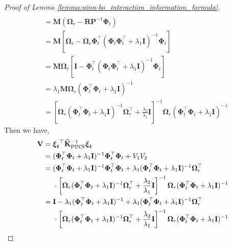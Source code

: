 \begin{proof}[Proof of Lemma \ref{lemma:pinn-bo_interaction_information_formula}]
\begin{align*}
\\
            & = \mathbf{M}(\boldsymbol{\Omega}_r - \mathbf{R}\mathbf{P}^{-1}\boldsymbol{\Phi}_t)
\\
            & = \mathbf{M}\left[\boldsymbol{\Omega}_r - \boldsymbol{\Omega}_r \boldsymbol{\Phi}_t^\top (\boldsymbol{\Phi}_t \boldsymbol{\Phi}_t^\top + \lambda_1\mathbf{I})^{-1}\boldsymbol{\Phi}_t\right] 
\\
            & = \mathbf{M}\boldsymbol{\Omega}_r \left[ \mathbf{I} - \boldsymbol{\Phi}_t^\top (\boldsymbol{\Phi}_t \boldsymbol{\Phi}_t^\top + \lambda_1\mathbf{I})^{-1}\boldsymbol{\Phi}_t\right]
\\
            & = \lambda_1 \mathbf{M} \boldsymbol{\Omega}_r (\boldsymbol{\Phi}_t^\top \boldsymbol{\Phi}_t + \lambda_1\mathbf{I})^{-1} 
\\ 
            & = \left[\boldsymbol{\Omega}_r(\boldsymbol{\Phi}_t^\top \boldsymbol{\Phi}_t+ \lambda_1\mathbf{I})^{-1}\boldsymbol{\Omega}_r^\top + \frac{\lambda_2} {\lambda_1} \mathbf{I}\right]^{-1} \boldsymbol{\Omega}_r (\boldsymbol{\Phi}_t^\top \boldsymbol{\Phi}_t + \lambda_1\mathbf{I})^{-1}
\end{align*}
Then we have, 
    \begin{align*}
            \mathbf{V} &= \boldsymbol{\boldsymbol{\xi}_t}^\top \mathbf{\widehat{K}}_\mathrm{PINN}^{-1} \boldsymbol{\boldsymbol{\xi}_t}  
            \\
            & = (\boldsymbol{\Phi}_t^\top\boldsymbol{\Phi}_t+\lambda_1 \mathbf{I})^{-1} \boldsymbol{\Phi}_t^\top\boldsymbol{\Phi}_t + V_1V_2
            \\
            & = (\boldsymbol{\Phi}_t^\top\boldsymbol{\Phi}_t+\lambda_1 \mathbf{I})^{-1} \boldsymbol{\Phi}_t^\top\boldsymbol{\Phi}_t + \lambda_1(\boldsymbol{\Phi}_t^\top\boldsymbol{\Phi}_t + \lambda_1\mathbf{I})^{-1} \boldsymbol{\Omega}_r^\top \notag \\
            &  \;\;\;\;\; \cdot \left[\boldsymbol{\Omega}_r(\boldsymbol{\Phi}_t^\top \boldsymbol{\Phi}_t+ \lambda_1\mathbf{I})^{-1}\boldsymbol{\Omega}_r^\top + \frac{\lambda_2} {\lambda_1} \mathbf{I}\right]^{-1} \boldsymbol{\Omega}_r (\boldsymbol{\Phi}_t^\top \boldsymbol{\Phi}_t + \lambda_1\mathbf{I})^{-1} 
            \\
            &= \mathbf{I} - \lambda_1(\boldsymbol{\Phi}_t^\top\boldsymbol{\Phi}_t+\lambda_1 \mathbf{I})^{-1} + \lambda_1(\boldsymbol{\Phi}_t^\top\boldsymbol{\Phi}_t + \lambda_1\mathbf{I})^{-1} \boldsymbol{\Omega}_r^\top \notag \\
            & \;\;\;\;\;   \cdot \left[\boldsymbol{\Omega}_r(\boldsymbol{\Phi}_t^\top \boldsymbol{\Phi}_t+ \lambda_1\mathbf{I})^{-1}\boldsymbol{\Omega}_r^\top + \frac{\lambda_2} {\lambda_1} \mathbf{I}\right]^{-1} \boldsymbol{\Omega}_r (\boldsymbol{\Phi}_t^\top \boldsymbol{\Phi}_t + \lambda_1\mathbf{I})^{-1} 

\end{align*}
\end{proof}
